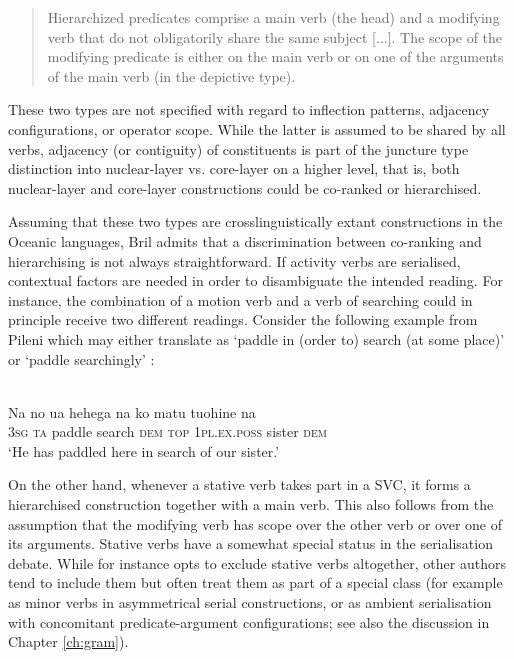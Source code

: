 \begin{quote}Hierarchized predicates comprise a main verb (the head) and a modifying verb that do not obligatorily share the same subject [...]. The scope of the modifying predicate is either on the main verb or on one of the arguments of the main verb (in the
depictive type). \citep[270]{bril2007nexus}\end{quote}

These two types are not specified with regard to inflection patterns, adjacency configurations, or operator scope. While the latter is assumed to be shared by all verbs, adjacency (or contiguity) of constituents is part of the juncture type distinction into nuclear-layer vs. core-layer on a higher level, that is, both nuclear-layer and core-layer constructions could be co-ranked or hierarchised.

Assuming that these two types are crosslinguistically extant constructions in the Oceanic languages, Bril admits that a discrimination between co-ranking and hierarchising is not always straightforward. If activity verbs are serialised, contextual factors are needed in order to disambiguate the intended reading. For instance, the combination of a motion verb and a verb of searching could in principle receive two different readings. Consider the following example from Pileni which may either translate as `paddle in (order to) search (at some place)' or `paddle searchingly' \citep[271]{bril2007nexus}:

\ea 
{}\\
\gll Na no ua hehega na ko matu tuohine na \\
\textsc{3}\textsc{sg} \textsc{ta} paddle search \textsc{dem} \textsc{top} \textsc{1}\textsc{pl}.\textsc{ex}.\textsc{poss} sister \textsc{dem} \\
\glft `He has paddled here in search of our sister.’\\ 
\z

On the other hand, whenever a stative verb takes part in a SVC, it forms a hierarchised construction together with a main verb. This also follows from the assumption that the modifying verb has scope over the other verb or over one of its arguments. Stative verbs have a somewhat special status in the serialisation debate. While for instance \citet{haspelmath2016serial} opts to exclude stative verbs altogether, other authors tend to include them but often treat them as part of a special class (for example as minor verbs in asymmetrical serial constructions, or as ambient serialisation with concomitant predicate-argument configurations; see also the discussion in Chapter \ref{ch:gram}). 

